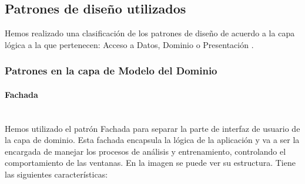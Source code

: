 \subsection{Patrones de diseño utilizados}
Hemos realizado una clasificación de los patrones de diseño de acuerdo a la capa lógica a la que pertenecen: Acceso a Datos, Dominio o Presentación \cite{carlos_lopez_nozal_apuntes_2012}.

\subsubsection{Patrones en la capa de Modelo del Dominio}

\paragraph{Fachada}\mbox{} \\
\indent Hemos utilizado el patrón Fachada para separar la parte de interfaz de usuario de la capa de dominio. Esta fachada encapsula la lógica de la aplicación y va a ser la encargada de manejar los procesos de análisis y entrenamiento, controlando el comportamiento de las ventanas. En la imagen  se puede ver su estructura. Tiene las siguientes características:


